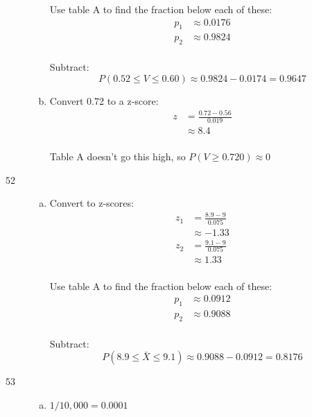 \documentclass[letterpaper, landscape]{exam}
\begin{document}
\begin{description}
\begin{enumerate}[(a)]
            Use table A to find the fraction below each of these:
            \begin{align*}
              p_1 &\approx 0.0176 \\
              p_2 &\approx 0.9824 \\
            \end{align*}

            Subtract:
            \[
              P(0.52 \leq V \leq 0.60) \approx 0.9824 - 0.0174 = \boxed{ 0.9647 }
            \]

          \item Convert 0.72 to a z-score:
            \begin{align*}
              z & = \frac{0.72 - 0.56}{0.019} \\
                & \approx 8.4 \\
            \end{align*}

            Table A doesn't go this high, so $P(V \geq 0.720) \approx 0$
        \end{enumerate}  

      \item[52]
        \begin{enumerate}[(a)]
          \item Convert to z-scores:
            \begin{align*}
              z_1 & = \frac{8.9 - 9}{0.075} \\
                  & \approx -1.33 \\
              z_2 & = \frac{9.1 - 9}{0.075} \\
                  & \approx 1.33 \\
            \end{align*}

            Use table A to find the fraction below each of these:
            \begin{align*}
              p_1 &\approx 0.0912 \\
              p_2 &\approx 0.9088 \\
            \end{align*}

            Subtract:
            \[
              P(8.9 \leq \bar{X} \leq 9.1) \approx 0.9088 - 0.0912 = \boxed{ 0.8176 }
            \]
          \end{enumerate}

        \item[53]
          \begin{enumerate}[(a)]
            \item $1/10,000 = \boxed{ 0.0001 }$


\end{enumerate}
\end{description}
\end{document}
